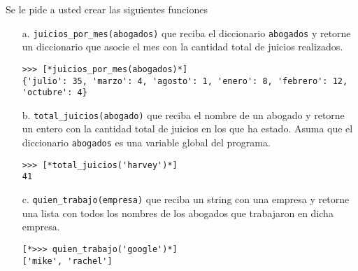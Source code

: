 Se le pide a usted crear las siguientes funciones
\begin{itemize}
    \item[a.] \texttt{juicios\_por\_mes(abogados)} que reciba el diccionario \texttt{abogados} y retorne un diccionario que asocie el mes con la cantidad total de juicios realizados.
    \begin{lstlisting}[style=consola]
>>> [*juicios_por_mes(abogados)*]
{'julio': 35, 'marzo': 4, 'agosto': 1, 'enero': 8, 'febrero': 12, 
'octubre': 4}
    \end{lstlisting}
    
    \item[b.] \texttt{total\_juicios(abogado)} que reciba el nombre de un abogado y retorne un entero con la cantidad total de juicios en los que ha estado. Asuma que el diccionario \texttt{abogados} es una variable global del programa.
    \begin{lstlisting}[style=consola]
>>> [*total_juicios('harvey')*]
41
    \end{lstlisting}
    
    \item[c.] \texttt{quien\_trabajo(empresa)} que reciba un string con una empresa y retorne una lista con todos los nombres de los abogados que trabajaron en dicha empresa.
    \begin{lstlisting}[style=consola]
[*>>> quien_trabajo('google')*]
['mike', 'rachel']
    \end{lstlisting}
\end{itemize}
